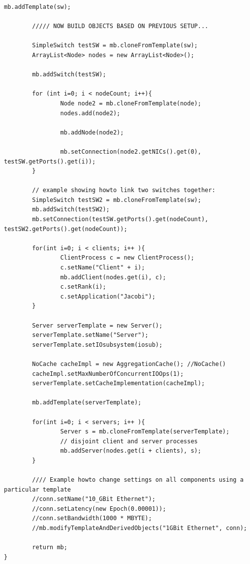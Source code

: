 \documentclass[
     11pt,         %
     a4paper,      %
     BCOR10mm,     %
     DIV14,        %
     liststotoc,   %
     bibtotoc,     %
     idxtotoc,     %
     parskip       %
     ]{scrreprt}   %
\begin{document}
\begin{appendix}
\begin{lstlisting}[numbers=none,caption=Example code to build a disjoint client and server cluster model,label=lst:exampleClusterBuild,basicstyle=\ttfamily\scriptsize]
        mb.addTemplate(sw);

        ///// NOW BUILD OBJECTS BASED ON PREVIOUS SETUP...

        SimpleSwitch testSW = mb.cloneFromTemplate(sw);
        ArrayList<Node> nodes = new ArrayList<Node>();

        mb.addSwitch(testSW);

        for (int i=0; i < nodeCount; i++){
                Node node2 = mb.cloneFromTemplate(node);
                nodes.add(node2);

                mb.addNode(node2);

                mb.setConnection(node2.getNICs().get(0), testSW.getPorts().get(i));
        }

        // example showing howto link two switches together:
        SimpleSwitch testSW2 = mb.cloneFromTemplate(sw);
        mb.addSwitch(testSW2);
        mb.setConnection(testSW.getPorts().get(nodeCount), testSW2.getPorts().get(nodeCount));

        for(int i=0; i < clients; i++ ){
                ClientProcess c = new ClientProcess();
                c.setName("Client" + i);
                mb.addClient(nodes.get(i), c);
                c.setRank(i);
                c.setApplication("Jacobi");
        }

        Server serverTemplate = new Server();
        serverTemplate.setName("Server");
        serverTemplate.setIOsubsystem(iosub);

        NoCache cacheImpl = new AggregationCache(); //NoCache()
        cacheImpl.setMaxNumberOfConcurrentIOOps(1);
        serverTemplate.setCacheImplementation(cacheImpl);

        mb.addTemplate(serverTemplate);

        for(int i=0; i < servers; i++ ){
                Server s = mb.cloneFromTemplate(serverTemplate);
                // disjoint client and server processes
                mb.addServer(nodes.get(i + clients), s);
        }

        //// Example howto change settings on all components using a particular template
        //conn.setName("10_GBit Ethernet");
        //conn.setLatency(new Epoch(0.00001));
        //conn.setBandwidth(1000 * MBYTE);
        //mb.modifyTemplateAndDerivedObjects("1GBit Ethernet", conn);

        return mb;
}
\end{lstlisting}

\listoffigures
\listoftables

\end{appendix}


\appendix
\end{document}
